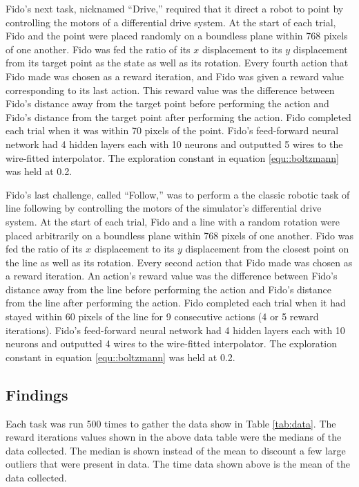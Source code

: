 Fido's next task, nicknamed ``Drive,'' required that it direct a robot to point by controlling the motors of a differential drive system. At the start of each trial, Fido and the point were placed randomly on a boundless plane within 768 pixels of one another. Fido was fed the ratio of its $x$ displacement to its $y$ displacement from its target point as the state as well as its rotation. Every fourth action that Fido made was chosen as a reward iteration, and Fido was given a reward value corresponding to its last action. This reward value was the difference between Fido's distance away from the target point before performing the action and Fido's distance from the target point after performing the action. Fido completed each trial when it was within 70 pixels of the point. Fido's feed-forward neural network had 4 hidden layers each with 10 neurons and outputted 5 wires to the wire-fitted interpolator. The exploration constant in equation \ref{equ::boltzmann} was held at 0.2.

Fido's last challenge, called ``Follow,'' was to perform a the classic robotic task of line following by controlling the motors of the simulator's differential drive system. At the start of each trial, Fido and a line with a random rotation were placed arbitrarily on a boundless plane within 768 pixels of one another. Fido was fed the ratio of its $x$ displacement to its $y$ displacement from the closest point on the line as well as its rotation. Every second action that Fido made was chosen as a reward iteration. An action's reward value was the difference between Fido's distance away from the line before performing the action and Fido's distance from the line after performing the action. Fido completed each trial when it had stayed within 60 pixels of the line for 9 consecutive actions (4 or 5 reward iterations). Fido's feed-forward neural network had 4 hidden layers each with 10 neurons and outputted 4 wires to the wire-fitted interpolator. The exploration constant in equation \ref{equ::boltzmann} was held at 0.2.

\subsection{Findings}

Each task was run 500 times to gather the data show in Table \ref{tab:data}.  The reward iterations values shown in the above data table were the medians of the data collected. The median is shown instead of the mean to discount a few large outliers that were present in data. The time data shown above is the mean of the data collected.

